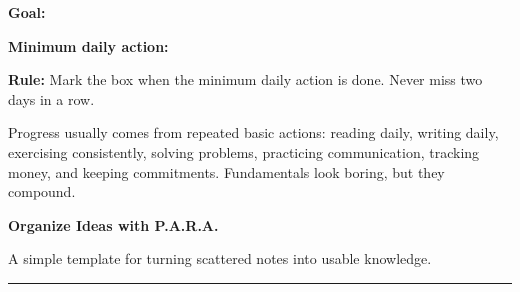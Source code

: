 \documentclass[10pt,a4paper]{article}
\newcommand{\FillLine}{\makebox[0.82\linewidth]{\hrulefill}}
\newcommand{\pagetitle}[2]{%
  {\fontsize{26}{29}\selectfont\bfseries #1}\par
  {\large\color{SoftInk}#2}\par\vspace{3mm}\hrule\vspace{4mm}
}
\begin{document}
\begin{minipage}[t]{0.48\linewidth}
\begin{tcolorbox}[usebox,title={Seinfeld Strategy: don't break the chain}]
\textbf{Goal:} \FillLine\par\vspace{2mm}
\textbf{Minimum daily action:} \FillLine\par\vspace{2mm}
\begin{center}
\end{center}
\textbf{Rule:} Mark the box when the minimum daily action is done. Never miss two days in a row.
\end{tcolorbox}

\begin{tcolorbox}[usebox,title={Master the fundamentals}]
Progress usually comes from repeated basic actions: reading daily, writing daily, exercising consistently, solving problems, practicing communication, tracking money, and keeping commitments. Fundamentals look boring, but they compound.
\end{tcolorbox}
\end{minipage}


\newpage

\pagetitle{Organize Ideas with P.A.R.A.}{A simple template for turning scattered notes into usable knowledge.}
\end{document}
